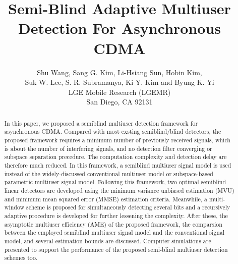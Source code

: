 \documentclass[a4paper,10pt,fleqn, twocolumn]{IEEETran}
\title{ Semi-Blind Adaptive Multiuser Detection For Asynchronous CDMA }
\date{}
\author{Shu Wang, Sang G. Kim, Li-Hsiang Sun, Hobin Kim,\\Suk W. Lee, S. R. Subramanya, Ki Y. Kim and Byung K. Yi\\
LGE Mobile Research (LGEMR)\\San Diego, CA 92131}
\begin{document}
\maketitle
\begin{abstract}\small
In this paper, we proposed a semiblind multiuser detection
framework for asynchronous CDMA. Compared with most exsting
semiblind/blind detectors, the proposed framework requires a
minimum number of previously received signals, which is about the
number of interfering signals, and no detection filter converging
or subspace separation precedure. The computation complexity and
detection delay are therefore much reduced. In this framework, a
semiblind multiuser signal model is used instead of the
widely-discussed conventional multiuser model or subspace-based
parametric multiuser signal model. Following this framework, two
optimal semiblind linear detectors are developed using the minimum
variance unbiased estimation (MVU) and minimum mean squared error
(MMSE) estimation criteria. Meanwhile, a multi-window scheme is
proposed for simultaneously detecting several bits and a
recursively adaptive procedure is developed for further lessening
the complexity. After these, the asymptotic multiuser efficiency
(AME) of the proposed framework, the comparsion between the
employed semiblind multiuser signal model and the conventional
signal model, and several estimation bounds are discussed.
Computer simulations are presented to support the performance of
the proposed semi-blind multiuser detection schemes too.
\end{abstract}
\end{document}
